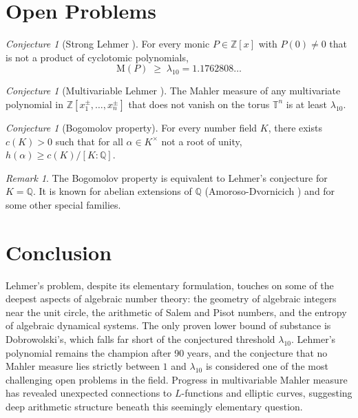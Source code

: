 \documentclass[12pt,a4paper]{amsart}
\theoremstyle{definition}
\theoremstyle{remark}
\newtheorem{remark}[theorem]{Remark}
\newtheorem{conjecture}[theorem]{Conjecture}
\newcommand{\Z}{\mathbb{Z}}
\newcommand{\Q}{\mathbb{Q}}
\newcommand{\T}{\mathbb{T}}
\newcommand{\M}{\mathrm{M}}
\begin{document}
\section{Open Problems}\label{sec:openproblems}

\begin{conjecture}[Strong Lehmer \cite{Lehmer1933}]\label{conj:stronglehmer}
  For every monic $P \in \Z[x]$ with $P(0) \neq 0$ that is not a product of cyclotomic
  polynomials,
  \[
    \M(P) \;\geq\; \lambda_{10} = 1.1762808\ldots
  \]
\end{conjecture}

\begin{conjecture}[Multivariable Lehmer \cite{Boyd1981}]
  The Mahler measure of any multivariate polynomial in $\Z[x_1^\pm,\ldots,x_n^\pm]$
  that does not vanish on the torus $\T^n$ is at least $\lambda_{10}$.
\end{conjecture}

\begin{conjecture}[Bogomolov property]
  For every number field $K$, there exists $c(K) > 0$ such that for all
  $\alpha \in K^\times$ not a root of unity, $h(\alpha) \geq c(K)/[K:\Q]$.
\end{conjecture}

\begin{remark}
  The Bogomolov property is equivalent to Lehmer's conjecture for $K = \Q$.
  It is known for abelian extensions of $\Q$ (Amoroso-Dvornicich \cite{AD2000}) and
  for some other special families.
\end{remark}

\section{Conclusion}\label{sec:conclusion}

Lehmer's problem, despite its elementary formulation, touches on some of the deepest
aspects of algebraic number theory: the geometry of algebraic integers near the unit
circle, the arithmetic of Salem and Pisot numbers, and the entropy of algebraic
dynamical systems. The only proven lower bound of substance is Dobrowolski's, which
falls far short of the conjectured threshold $\lambda_{10}$. Lehmer's polynomial remains
the champion after 90 years, and the conjecture that no Mahler measure lies strictly
between $1$ and $\lambda_{10}$ is considered one of the most challenging open problems
in the field. Progress in multivariable Mahler measure has revealed unexpected connections
to $L$-functions and elliptic curves, suggesting deep arithmetic structure beneath this
seemingly elementary question.
\end{document}

